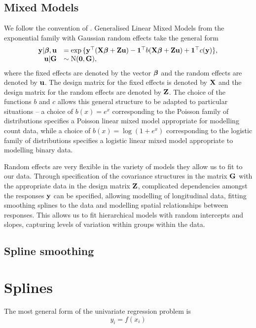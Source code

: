 \subsection{Mixed Models}

We follow the convention of \citep{Zhao2006}. Generalised Linear Mixed Models from the exponential family with
Gaussian random effects take the general form
$$
\begin{array}{rl}
	{\bf y} | {\boldsymbol \beta}, {\bf u} &= \exp{\{ {\bf y}^\top ({\bf X}{\boldsymbol\beta}+ {\bf Z}{\bf u}) - {\bf1}^\top b({\bf X}{\boldsymbol\beta}+ {\bf Z}{\bf u}) + {\bf1}^\top c({\bf y}) \}}, \\
	{\bf u} | {\bf G} &\sim \text{N}({\bf 0}, {\bf G}),
\end{array}
$$
where the fixed effects are denoted by the vector ${\boldsymbol \beta}$ and the random effects are denoted by ${\bf u}$. The
design matrix for the fixed effects is denoted by ${\bf X}$ and the design matrix for the random effects are
denoted by ${\bf Z}$. The choice of the functions $b$ and $c$ allows this general structure to be adapted to
particular situations -- a choice of $b(x) = e^x$ corresponding to the Poisson family of distributions
specifies a Poisson linear mixed model appropriate for modelling count data, while a choice of $b(x) = \log(1
+ e^x)$ corresponding to the logistic family of distributions specifies a logistic linear mixed model
appropriate to modelling binary data.

Random effects are very flexible in the variety of models they allow us to fit to our data. Through
specification of the covariance structures in the matrix ${\bf G}$ with the appropriate data in the design matrix
${\bf Z}$, complicated dependencies amongst the responses ${\bf y}$ can be specified, allowing modelling of
longitudinal data, fitting smoothing splines to the data and modelling spatial relationships between
responses. This allows us to fit hierarchical models with random intercepts and slopes, capturing levels of variation within groups within the data.
\citep{Gelman2007}

\subsection{Spline smoothing}
\section{Splines}
The most general form of the univariate regression problem is
\[
	y_i = f(x_i)
\]

